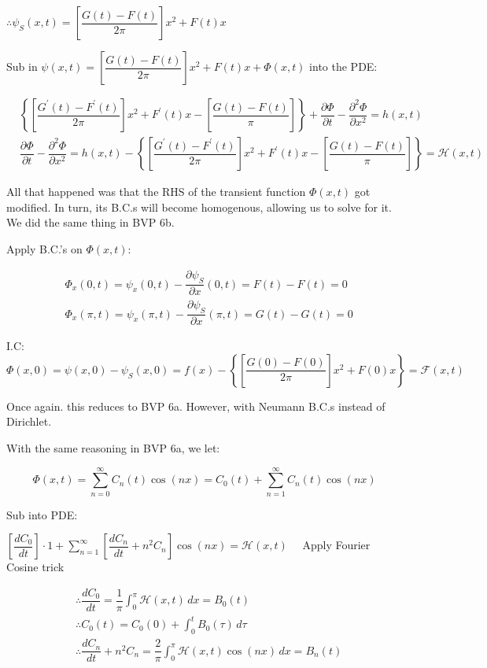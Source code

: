 \documentclass{report}
\begin{document}
$\therefore \boxed{\psi_{S}(x, t)=\left[\dfrac{G(t)-F(t)}{2 \pi}\right] x^{2}+F(t) x}$

Sub in $\psi(x, t)=\left[\dfrac{G(t)-F(t)}{2 \pi}\right] x^{2}+F(t) x+\Phi(x, t)$ into the PDE:

$$
\begin{aligned}
& \left\{\left[\dfrac{G^{\prime}(t)-F^{\prime}(t)}{2 \pi}\right] x^{2}+F^{\prime}(t) x-\left[\dfrac{G(t)-F(t)}{\pi}\right]\right\}+\dfrac{\partial \Phi}{\partial t}-\dfrac{\partial^{2} \Phi}{\partial x^{2}}=h(x, t) \\
& \dfrac{\partial \Phi}{\partial t}-\dfrac{\partial^{2} \Phi}{\partial x^{2}}=h(x, t)-\left\{\left[\dfrac{G^{\prime}(t)-F^{\prime}(t)}{2 \pi}\right] x^{2}+F^{\prime}(t) x-\left[\dfrac{G(t)-F(t)}{\pi}\right]\right\}=\mathcal{H}(x, t)
\end{aligned}
$$

All that happened was that the RHS of the transient function $\Phi(x,t)$ got modified. In turn, its B.C.s will become homogenous, allowing us to solve for it. We did the same thing in BVP 6b.  

Apply B.C.'s on $\Phi(x, t)$:

$$
\begin{aligned}
& \Phi_{x}(0, t)=\psi_{x}(0, t)-\dfrac{\partial \psi_{S}}{\partial x}(0, t)=F(t)-F(t)=0 \\
& \Phi_{x}(\pi, t)=\psi_{x}(\pi, t)-\dfrac{\partial \psi_{S}}{\partial x}(\pi, t)=G(t)-G(t)=0
\end{aligned}
$$

I.C: $\Phi(x, 0)=\psi(x, 0)-\psi_{S}(x, 0)=f(x)-\left\{\left[\dfrac{G(0)-F(0)}{2 \pi}\right] x^{2}+F(0) x\right\}=\mathcal{F}(x, t)$

Once again. this reduces to BVP 6a. However, with Neumann B.C.s instead of Dirichlet.

With the same reasoning in BVP 6a, we let: 

$$
\Phi(x, t)=\sum\limits_{n=0}^{\infty} C_{n}(t) \cos (n x)=C_{0}(t)+\sum\limits_{n=1}^{\infty} C_{n}(t) \cos (n x)
$$

Sub into PDE:

$\left[\dfrac{d C_{0}}{d t}\right] \cdot 1+\sum\limits_{n=1}^{\infty}\left[\dfrac{d C_{n}}{d t}+n^{2} C_{n}\right] \cos (n x)=\mathcal{H}(x, t) \quad$ Apply Fourier Cosine trick

$$
\begin{aligned}
& \therefore \dfrac{d C_{0}}{d t}=\dfrac{1}{\pi}\int_{0}^{\pi} \mathcal{H}(x,t)\,dx = B_{0}(t) \\
& \therefore \boxed{C_{0}(t)=C_{0}(0)+\int_{0}^{t} B_{0}(\tau)\,d\tau} \\
& \therefore \dfrac{d C_{n}}{d t}+n^{2} C_{n}=\dfrac{2}{\pi}\int_{0}^{\pi} \mathcal{H}(x,t)\cos(nx)\,dx = B_{n}(t)
\end{aligned}
$$
\end{document}
